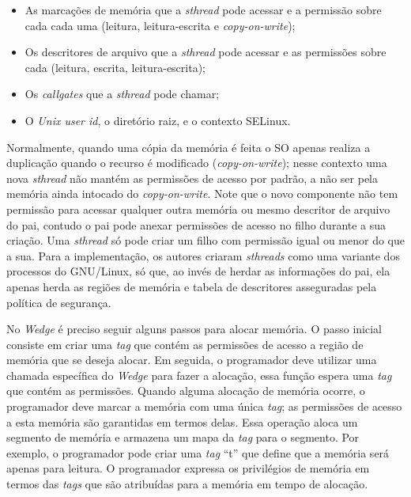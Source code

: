 \begin{itemize}
	\item As marcações de memória que a \emph{sthread} pode acessar e a permissão
				sobre cada cada uma (leitura, leitura-escrita e \textit{copy-on-write});
	\item Os descritores de arquivo que a \emph{sthread} pode acessar e as
				permissões sobre cada (leitura, escrita, leitura-escrita);
	\item Os \emph{callgates} que a \emph{sthread} pode chamar;
	\item O \emph{Unix user id}, o diretório raiz, e o contexto SELinux.
\end{itemize}

Normalmente, quando uma cópia da memória é feita o SO apenas realiza a
duplicação quando o recurso é modificado (\emph{copy-on-write}); nesse contexto
uma nova \emph{sthread} não mantém as permissões de acesso por padrão, a não
ser pela memória ainda intocado do \emph{copy-on-write}. Note que o novo
componente não tem permissão para acessar qualquer outra memória ou mesmo
descritor de arquivo do pai, contudo o pai pode anexar permissões de acesso no
filho durante a sua criação. Uma \emph{sthread} só pode criar um filho com
permissão igual ou menor do que a sua. Para a implementação, os autores criaram
\emph{sthreads} como uma variante dos processos do GNU/Linux, só que, ao invés
de herdar as informações do pai, ela apenas herda as regiões de memória e
tabela de descritores asseguradas pela política de segurança.

No \emph{Wedge} é preciso seguir alguns passos para alocar memória. O passo
inicial consiste em criar uma \emph{tag} que contém as permissões de acesso a
região de memória que se deseja alocar. Em seguida, o programador deve utilizar
uma chamada específica do \emph{Wedge} para fazer a alocação, essa função
espera uma \emph{tag} que contém as permissões. Quando alguma alocação de
memória ocorre, o programador deve marcar a memória com uma única \emph{tag};
as permissões de acesso a esta memória são garantidas em termos delas. Essa
operação aloca um segmento de memória e armazena um mapa da \emph{tag} para o
segmento. Por exemplo, o programador pode criar uma \emph{tag} ``t'' que define
que a memória será apenas para leitura. O programador expressa os privilégios
de memória em termos das \emph{tags} que são atribuídas para a memória em tempo
de alocação.

